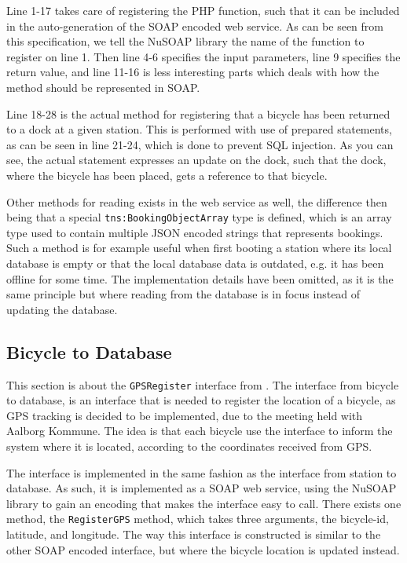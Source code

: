 Line 1-17 takes care of registering the PHP function, such that it can be included in the auto-generation of the SOAP encoded web service.
As can be seen from this specification, we tell the NuSOAP library the name of the function to register on line 1.
Then line 4-6 specifies the input parameters, line 9 specifies the return value, and line 11-16 is less interesting parts which deals with how the method should be represented in SOAP.

Line 18-28 is the actual method for registering that a bicycle has been returned to a dock at a given station.
This is performed with use of prepared statements, as can be seen in line 21-24, which is done to prevent SQL injection.
As you can see, the actual statement expresses an update on the dock, such that the dock, where the bicycle has been placed, gets a reference to that bicycle.

Other methods for reading exists in the web service as well, the difference then being that a special \texttt{tns:BookingObjectArray} type is defined, which is an array type used to contain multiple JSON encoded strings that represents bookings. Such a method is for example useful when first booting a station where its local database is empty or that the local database data is outdated, e.g. it has been offline for some time.
The implementation details have been omitted, as it is the same principle but where reading from the database is in focus instead of updating the database.

\subsection{Bicycle to Database}\label{subsec:bicycletodatabase}
This section is about the \texttt{GPSRegister} interface from .
The interface from bicycle to database, is an interface that is needed to register the location of a bicycle, as GPS tracking is decided to be implemented, due to the meeting held with Aalborg Kommune.
The idea is that each bicycle use the interface to inform the system where it is located, according to the coordinates received from GPS.

The interface is implemented in the same fashion as the interface from station to database.
As such, it is implemented as a SOAP web service, using the NuSOAP library to gain an encoding that makes the interface easy to call.
There exists one method, the \texttt{RegisterGPS} method, which takes three arguments, the bicycle-id, latitude, and longitude.
The way this interface is constructed is similar to the other SOAP encoded interface, but where the bicycle location is updated instead.